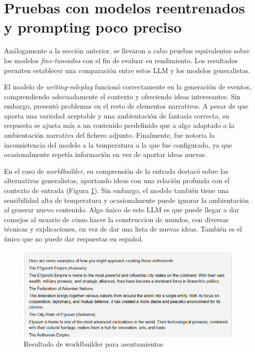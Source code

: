 \section{Pruebas con modelos reentrenados y prompting poco preciso}
Análogamente a la sección anterior, se llevaron a cabo pruebas equivalentes
sobre los modelos \textit{fine-tuneados} con el fin de evaluar su rendimiento.
Los resultados permiten establecer una comparación entre estos LLM
y los modelos generalistas.

El modelo de \textit{writing-roleplay} funcionó correctamente en la generación de eventos,
comprendiendo adecuadamente el contexto y ofreciendo ideas interesantes.
Sin embargo, presentó problemas en el resto de elementos narrativos.
A pesar de que aporta una variedad aceptable y una ambientación de fantasía correcta,
su respuesta se ajusta más a un contenido predefinido que a algo adaptado a la ambientación
narrativa del fichero adjunto.
Finalmente, fue notoria la inconsistencia del modelo a la temperatura a la que fue configurado,
ya que ocasionalmente repetía información en vez de aportar ideas nuevas.

En el caso de \textit{worldbuilder},
su comprensión de la entrada destacó sobre las alternativas generalistas,
aportando ideas con una relación profunda con el contexto de entrada
(Figura \ref{fig:worldbuilder-settle}).
Sin embargo, el modelo también tiene una sensibilidad alta de temperatura
y ocasionalmente puede ignorar la ambientación al generar nuevo contenido.
Algo único de este LLM es que puede llegar a dar consejos al usuario de cómo
hacer la construccion de mundos, con diversas técnicas y explicaciones,
en vez de dar una lista de nuevas ideas.
También es el único que no puede dar respuestas en español.

\begin{figure}[htbp]
	\centering
	\includegraphics[width=1\textwidth]{./Figures/worldbuilder-noprompt-settlements.png}
	\caption{Resultado de worldbuilder para asentamientos}
	\label{fig:worldbuilder-settle}
\end{figure}

